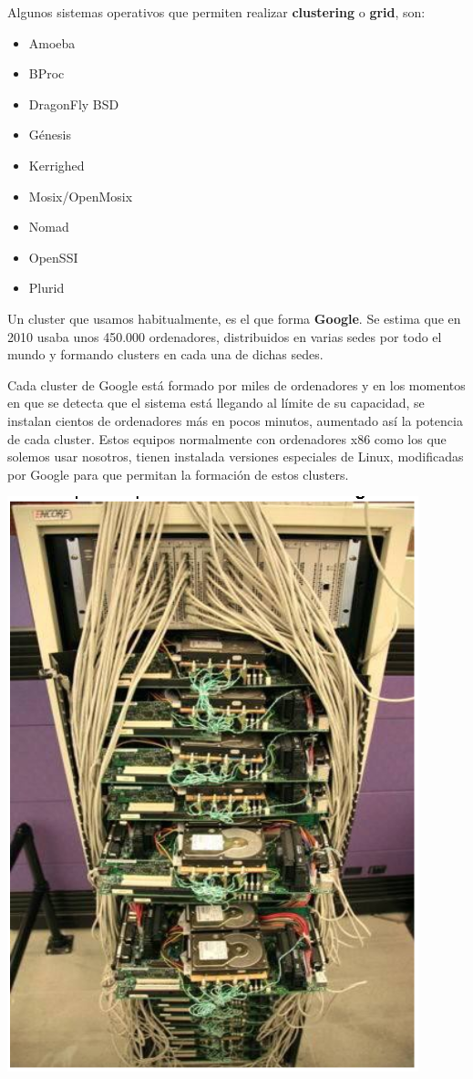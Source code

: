 \documentclass[11pt]{article}
\begin{document}
Algunos sistemas operativos que permiten realizar \textbf{clustering} o \textbf{grid},
son:

\begin{itemize}
\item Amoeba
\item BProc
\item DragonFly BSD
\item Génesis
\item Kerrighed
\item Mosix/OpenMosix
\item Nomad
\item OpenSSI
\item Plurid
\end{itemize}

Un cluster que usamos habitualmente, es el que forma \textbf{Google}. Se estima
que en 2010 usaba unos 450.000 ordenadores, distribuidos en varias sedes
por todo el mundo y formando clusters en cada una de dichas sedes.

Cada cluster de Google está formado por miles de ordenadores y en los
momentos en que se detecta que el sistema está llegando al límite de su
capacidad, se instalan cientos de ordenadores más en pocos minutos,
aumentado así la potencia de cada cluster. Estos equipos normalmente con
ordenadores x86 como los que solemos usar nosotros, tienen instalada
versiones especiales de Linux, modificadas por Google para que permitan
la formación de estos clusters.

\begin{center}
\includegraphics[width=.9\linewidth]{ArquitecturaSistemaOperativo/SO_Google.PNG}
\end{center}
\end{document}
